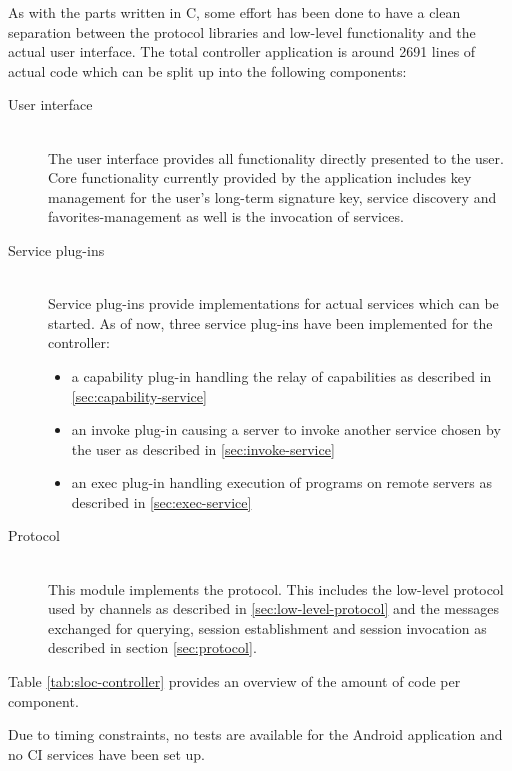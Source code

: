 As with the parts written in C, some effort has been done to have a clean separation between the protocol libraries and low-level functionality and the actual user interface.
The total controller application is around 2691 lines of actual code which can be split up into the following components:
\begin{description}
    \item[User interface]\hfill\\
        The user interface provides all functionality directly presented to the user.
        Core functionality currently provided by the application includes key management for the user's long-term signature key, service discovery and favorites-management as well is the invocation of services.
    \item[Service plug-ins]\hfill\\
        Service plug-ins provide implementations for actual services which can be started.
        As of now, three service plug-ins have been implemented for the controller:
        \begin{itemize}
            \item a capability plug-in handling the relay of capabilities as described in \ref{sec:capability-service}
            \item an invoke plug-in causing a server to invoke another service chosen by the user as described in \ref{sec:invoke-service}
            \item an exec plug-in handling execution of programs on remote servers as described in \ref{sec:exec-service}
        \end{itemize}
    \item[Protocol]\hfill\\
        This module implements the protocol.
        This includes the low-level protocol used by channels as described in \ref{sec:low-level-protocol} and the messages exchanged for querying, session establishment and session invocation as described in section \ref{sec:protocol}.
\end{description}

Table \ref{tab:sloc-controller} provides an overview of the amount of code per component.

Due to timing constraints, no tests are available for the Android application and no CI services have been set up.

